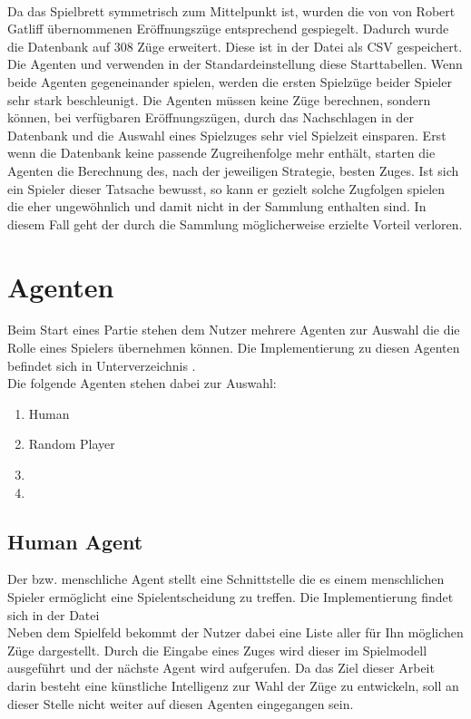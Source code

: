 \\Da das Spielbrett symmetrisch zum Mittelpunkt ist, wurden die von von Robert Gatliff \cite{open1} übernommenen Eröffnungszüge entsprechend gespiegelt. Dadurch wurde die Datenbank auf 308 Züge erweitert. Diese ist in der Datei  als CSV gespeichert.
\\Die Agenten \mxZitat{\mc} und \mxZitat{\abp} verwenden in der Standardeinstellung diese Starttabellen. Wenn beide Agenten gegeneinander spielen, werden die ersten Spielzüge beider Spieler sehr stark beschleunigt. Die Agenten müssen keine Züge berechnen, sondern können, bei verfügbaren Eröffnungszügen, durch das Nachschlagen in der Datenbank und die Auswahl eines Spielzuges sehr viel Spielzeit einsparen. Erst wenn die Datenbank keine passende Zugreihenfolge mehr enthält, starten die Agenten die Berechnung des, nach der jeweiligen Strategie, besten Zuges. Ist sich ein Spieler dieser Tatsache bewusst, so kann er gezielt solche Zugfolgen spielen die eher ungewöhnlich und damit nicht in der Sammlung enthalten sind. In diesem Fall geht der durch die Sammlung möglicherweise erzielte Vorteil verloren.
\section{Agenten}
\authormax
\label{agenten}
Beim Start eines Partie stehen dem Nutzer mehrere Agenten zur Auswahl die die Rolle eines Spielers übernehmen können. Die Implementierung zu diesen Agenten befindet sich in Unterverzeichnis .
\\Die folgende Agenten stehen dabei zur Auswahl:
\begin{enumerate}
\item Human
\item Random Player
\item \mc
\item \abp
\end{enumerate}
\subsection{Human Agent}
Der  bzw. menschliche Agent stellt eine Schnittstelle die es einem menschlichen Spieler ermöglicht eine Spielentscheidung zu treffen. Die Implementierung findet sich in der Datei 
\\Neben dem Spielfeld bekommt der Nutzer dabei eine Liste aller für Ihn möglichen Züge dargestellt. Durch die Eingabe eines Zuges wird dieser im Spielmodell ausgeführt und der nächste Agent wird aufgerufen. Da das Ziel dieser Arbeit darin besteht eine künstliche Intelligenz zur Wahl der Züge zu entwickeln, soll an dieser Stelle nicht weiter auf diesen Agenten eingegangen sein.

